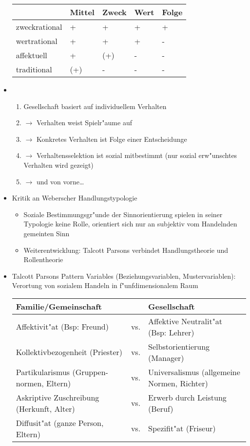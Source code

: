 \begin{itemize}
		\begin{tabular}[H]{lllll}
			& Mittel & Zweck & Wert & Folge \\ \hline
			zweckrational & + & + & + & + \\ \hline
			wertrational & + & + & + & - \\ \hline
			affektuell & + & (+) & - & - \\ \hline
			traditional & (+) & - & - & - \\ \hline
		\end{tabular}


	\item
		\begin{enumerate}
			\item Gesellschaft basiert auf individuellem Verhalten 
	\item$\rightarrow$ Verhalten weist Spielr"aume auf 
	\item$\rightarrow$ Konkretes Verhalten ist Folge einer Entscheidunge 
	\item$\rightarrow$ Verhaltensselektion ist sozial mitbestimmt (nur sozial erw"unschtes Verhalten wird gezeigt) 
	\item$\rightarrow$ und von vorne\dots
		\end{enumerate}

	\item
		Kritik an Weberscher Handlungstypologie
		\begin{itemize}
			\item
				Soziale Bestimmungsgr"unde der Sinnorientierung spielen in seiner Typologie keine Rolle, orientiert sich nur an subjektiv vom Handelnden gemeinten Sinn
				\item
					Weiterentwicklung: Talcott Parsons verbindet Handlungstheorie und Rollentheorie
		\end{itemize}
	\item
		Talcott Parsons Pattern Variables (Beziehungsvariablen, Mustervariablen): Verortung von sozialem Handeln in f"unfdimensionalem Raum

		\begin{tabular}[H]{lcl}
			Familie/Gemeinschaft & & Gesellschaft\\\hline
			Affektivit"at (Bsp: Freund) & vs. & Affektive Neutralit"at (Bsp: Lehrer) \\ \hline
			Kollektivbezogenheit (Priester) & vs. & Selbstorientierung (Manager) \\ \hline
			Partikularismus (Gruppen-normen, Eltern) & vs. & Universalismus (allgemeine Normen, Richter) \\ \hline
			Askriptive Zuschreibung (Herkunft, Alter) & vs. & Erwerb durch Leistung (Beruf) \\ \hline
			Diffusit"at (ganze Person, Eltern) & vs. & Spezifit"at (Friseur) \\ \hline
		\end{tabular}


\end{itemize}
